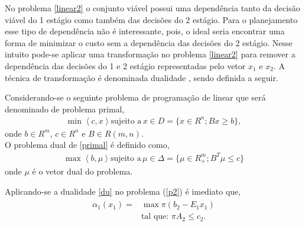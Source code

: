 No problema \ref{linear2} o conjunto vi\'avel possui uma depend\^encia tanto da decis\~ao vi\'avel do 1 est\'agio como
tamb\'em das decis\~oes do 2 est\'agio. Para o planejamento esse tipo de depend\^encia n\~ao \'e interessante, pois, o
ideal seria encontrar uma forma de minimizar o custo sem a depend\^encia das decis\~oes do 2 est\'agio. Nesse intuito pode-se
aplicar uma transforma\c c\~ao no problema \ref{linear2} para remover a depend\^encia das decis\~oes do 1 e 2 est\'agio
representadas pelo vetor $x_1$ e $x_2$. A t\'ecnica de transforma\c c\~ao \'e denominada dualidade \cite{boyd}, sendo definida a seguir.
	\begin{defin}%
		Considerando-se o seguinte problema de programa\c c\~ao de linear que ser\'a denominado de problema primal,
				\begin{align}
					\label {primal}
					\min \left < c,x \right >  \mbox{sujeito a} \hspace{2pt} x \in D = \{ x \in R^n;Bx \geq b \},
				\end{align}
				onde $b \in R^m$, $c \in R^n$ e $B \in R(m,n)$.\\

				O problema dual de \ref{primal} \'e definido como,
				\begin{align}
					\label {dual}
					\max \left<b,\mu \right> \mbox{sujeito a} \hspace{2pt} \mu \in \Delta = \{ \mu \in R_{+}^{m}; B^T\mu \leq c\}
				\end{align}
				onde $\mu$ \'e o vetor dual do problema.
				\label{du}
  	\end{defin}
	Aplicando-se a dualidade \ref{du} no problema (\ref{p2}) \'e imediato que,
\begin{align}
  \begin{split}	
 \alpha_{1}(x_1) = &\max \pi (b_2 - E_1x_1 ) \\
	&\mbox{tal que: }\pi A_2  \leq c_2.
  \end{split}
 	\label{p4}
\end{align}


